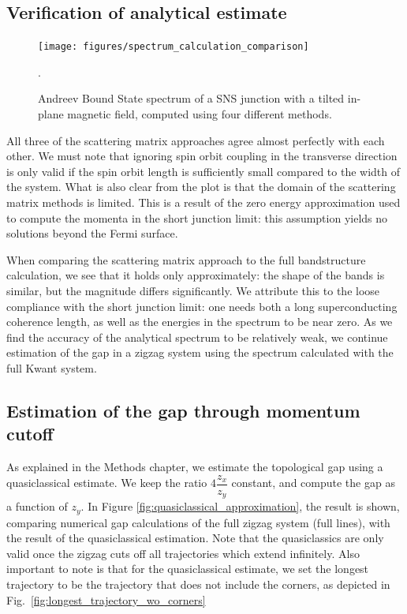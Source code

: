 		\subsection{Verification of analytical estimate}
			\begin{figure}[!htb]
			\centering
			\texttt{[image: figures/spectrum\_calculation\_comparison]}
			\caption{Andreev Bound State spectrum of a SNS junction with a tilted in-plane magnetic field, computed using four different methods.}.
			\label{fig:spectrum_calculation_comparison}
			\end{figure}
		
			All three of the scattering matrix approaches agree almost perfectly with each other.
			We must note that ignoring spin orbit coupling in the transverse direction is only valid if the spin orbit length is sufficiently small compared to the width of the system.
			What is also clear from the plot is that the domain of the scattering matrix methods is limited.
			This is a result of the zero energy approximation  used to compute the momenta in the short junction limit: this assumption yields no solutions beyond the Fermi surface.

			When comparing the scattering matrix approach to the full bandstructure calculation, we see that it holds only approximately: the shape of the bands is similar, but the magnitude differs significantly.
			We attribute this to the loose compliance with the short junction limit: one needs both a long superconducting coherence length, as well as the energies in the spectrum to be near zero.
			As we find the accuracy of the analytical spectrum to be relatively weak, we continue estimation of the gap in a zigzag system using the spectrum calculated with the full Kwant system.

		\subsection{Estimation of the gap through momentum cutoff}
			As explained in the Methods chapter, we estimate the topological gap using a quasiclassical estimate.
			We keep the ratio $4\dfrac{z_x}{z_y}$ constant, and compute the gap as a function of $z_y$.
			In Figure \ref{fig:quasiclassical_approximation}, the result is shown, comparing numerical gap calculations of the full zigzag system (full lines), with the result of the quasiclassical estimation.
			Note that the quasiclassics are only valid once the zigzag cuts off all trajectories which extend infinitely.
			Also important to note is that for the quasiclassical estimate, we set the longest trajectory to be the trajectory that does not include the corners, as depicted in Fig.~\ref{fig:longest_trajectory_wo_corners}

